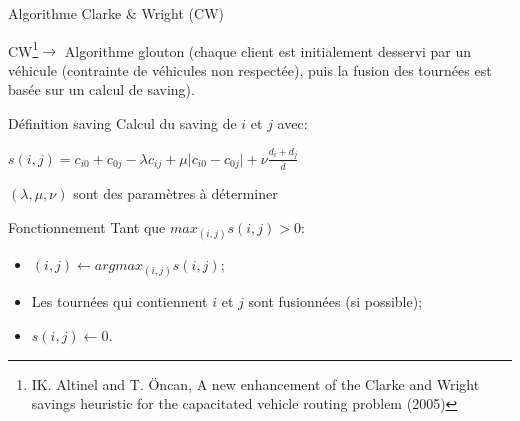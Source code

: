 \documentclass{beamer}
\begin{document}
\begin{frame}{Algorithme Clarke \& Wright (CW)}

CW\footnote{IK. Altinel and T. Öncan, A new enhancement of the Clarke and Wright savings heuristic for the capacitated vehicle routing problem (2005)}$\rightarrow$ Algorithme glouton (chaque client est initialement desservi par un véhicule (contrainte de véhicules non respectée), puis la fusion des tournées est basée sur un calcul de saving). 



\begin{exampleblock}{Définition saving}
Calcul du saving de $i$ et $j$ avec:

\centering
$s(i,j) = c_{i0} + c_{0j} - \lambda c_{ij} + \mu \vert c_{i0} - c_{0j} \vert + \nu \frac{d_i + d_j}{\overline{d}}$

\textcolor{rouge}{$(\lambda,\mu,\nu)$ sont des paramètres à déterminer}
\end{exampleblock}

\begin{block}{Fonctionnement}
Tant que $max_{(i,j)}s(i,j) > 0$:
\begin{itemize}
\item $(i,j) \leftarrow argmax_{(i,j)}s(i,j)$;
\item Les tournées qui contiennent $i$ et $j$ sont fusionnées (si possible);
\item $s(i,j) \leftarrow  0$.
\end{itemize} 

\end{block}
\end{frame}
\end{document}
